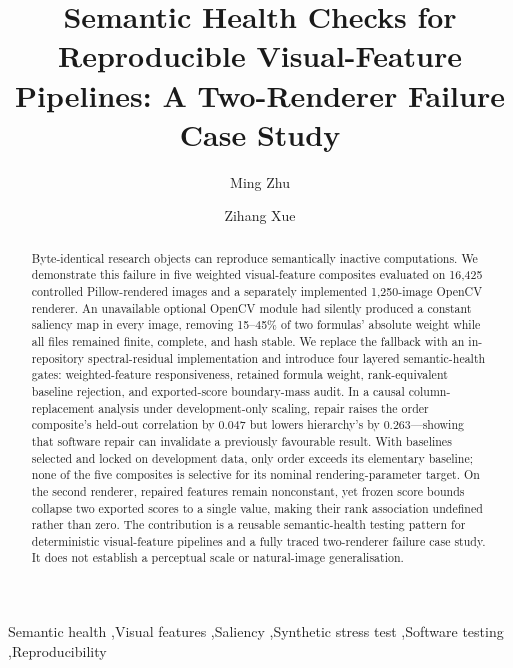 \documentclass[preprint,12pt]{elsarticle}
\begin{document}
\begin{frontmatter}

\title{Semantic Health Checks for Reproducible Visual-Feature Pipelines: A Two-Renderer Failure Case Study}

\author[addr1]{Ming Zhu}
\author[addr2]{Zihang Xue}

\address[addr1]{School of Art and Design, Henan University of Engineering, No.1 Xianghe Road, Longhu, Xinzheng, Zhengzhou, Henan 451191, China}
\address[addr2]{Department of Light Engineering, Qilu University of Technology, No.3501 Daxue Road, Changqing District, Jinan, Shandong 250353, China}

\begin{abstract}
Byte-identical research objects can reproduce semantically inactive computations. We demonstrate this failure in five weighted visual-feature composites evaluated on 16,425 controlled Pillow-rendered images and a separately implemented 1,250-image OpenCV renderer. An unavailable optional OpenCV module had silently produced a constant saliency map in every image, removing 15--45\% of two formulas' absolute weight while all files remained finite, complete, and hash stable. We replace the fallback with an in-repository spectral-residual implementation and introduce four layered semantic-health gates: weighted-feature responsiveness, retained formula weight, rank-equivalent baseline rejection, and exported-score boundary-mass audit. In a causal column-replacement analysis under development-only scaling, repair raises the order composite's held-out correlation by 0.047 but lowers hierarchy's by 0.263---showing that software repair can invalidate a previously favourable result. With baselines selected and locked on development data, only order exceeds its elementary baseline; none of the five composites is selective for its nominal rendering-parameter target. On the second renderer, repaired features remain nonconstant, yet frozen score bounds collapse two exported scores to a single value, making their rank association undefined rather than zero. The contribution is a reusable semantic-health testing pattern for deterministic visual-feature pipelines and a fully traced two-renderer failure case study. It does not establish a perceptual scale or natural-image generalisation.
\end{abstract}

\begin{keyword}
Semantic health \sep Visual features \sep Saliency \sep Synthetic stress test \sep Software testing \sep Reproducibility
\end{keyword}

\end{frontmatter}
\end{document}

